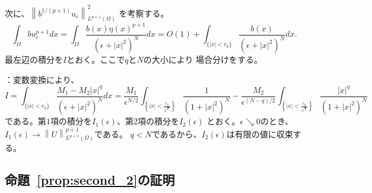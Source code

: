 次に、$\left\| b^{1/(p+1)} u_\epsilon \right\|_{L^{p+1}(\Omega)}^2$
を考察する。
\[
 \int_\Omega b u_{\epsilon}^{p+1} dx
 = \int_\Omega \frac{b(x) \eta(x)^{p+1}}{(\epsilon + \lvert x
 \rvert^2)^N} dx 
 = O(1) + \int_{ \{ \lvert x \rvert < r_0 \} } 
 \frac{b(x)}{(\epsilon + \lvert x
 \rvert^2)^N} dx.
\]
最左辺の積分を$I$とおく。ここで$q$と$N$の大小により
場合分けをする。

：変数変換により、
\[
 I = \int_{ \{ \lvert x \rvert < r_0 \} } 
 \frac{M_1 - M_2 \lvert x \rvert^q}{(\epsilon + \lvert x
 \rvert^2)^N} dx
 = \frac{M_1}{\epsilon^{N/2}} \int_{ \left\{ \lvert x \rvert <
 \frac{r_0}{\sqrt{\epsilon}} \right\}} \frac{1}{(1 + \lvert x
 \rvert^2)^N}
 - \frac{M_2}{\epsilon^{(N-q)/2}} \int_{ \left\{ \lvert x \rvert <
 \frac{r_0}{\sqrt{\epsilon}} \right\}}
 \frac{ \lvert x \rvert^q}{(1 + \lvert x
 \rvert^2)^N}
\]
である。第$1$項の積分を$I_1(\epsilon)$、第$2$項の積分を$I_2(\epsilon)$
とおく。$\epsilon \searrow 0$のとき、
$I_1(\epsilon) \to \left\| U \right\|_{L^{p+1}(\Omega)}^{p+1}$である。
$q < N$であるから、$I_2(\epsilon)$は有限の値に収束する。

\subsection{命題~\ref{prop:second_2}の証明}